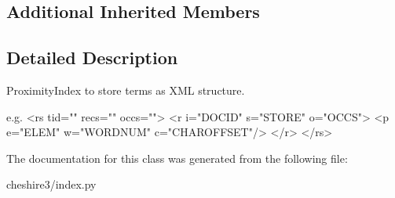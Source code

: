 \subsection*{Additional Inherited Members}


\subsection{Detailed Description}
\begin{DoxyVerb}ProximityIndex to store terms as XML structure.

e.g.
<rs tid="" recs="" occs="">
  <r i="DOCID" s="STORE" o="OCCS">
    <p e="ELEM" w="WORDNUM" c="CHAROFFSET"/>
  </r>
</rs>
\end{DoxyVerb}
 

The documentation for this class was generated from the following file\-:\begin{DoxyCompactItemize}
\item 
cheshire3/index.\-py\end{DoxyCompactItemize}
